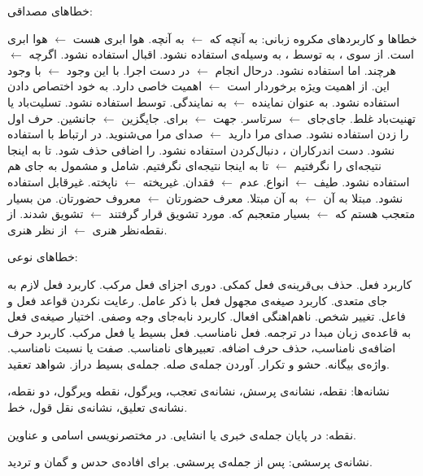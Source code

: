 \documentclass[10pt,landscape]{article}
\begin{document}
\begin{multicols*}{3}
{    خطاهای مصداقی:

    خطاها و کاربردهای مکروه زبانی:
    به آنچه که
    $\leftarrow$
    به آنچه.
    هوا ابری هست
    $\leftarrow$
    هوا ابری است.
    از سوی
    ،
    به توسط
    ،
    به وسیله‌ی
    استفاده نشود.
    اقبال استفاده نشود.
    اگرچه
    $\leftarrow$
    هرچند.
    اما استفاده نشود.
    درحال انجام
    $\leftarrow$
    در دست اجرا.
    با این وجود
    $\leftarrow$
    با وجود این.
    از اهمیت ویژه برخوردار است
    $\leftarrow$
    اهمیت خاصی دارد.
    به خود اختصاص دادن استفاده نشود.
    به عنوان نماینده
    $\leftarrow$
    به نمایندگی.
    توسط استفاده نشود.
    تسلیت‌باد یا تهنیت‌باد غلط.
    جای‌جای
    $\leftarrow$
    سرتاسر.
    جهت
    $\leftarrow$
    برای.
    جایگزین
    $\leftarrow$
    جانشین.
    حرف اول را زدن استفاده نشود.
    صدای مرا دارید
    $\leftarrow$
    صدای مرا می‌شنوید.
    در ارتباط با استفاده نشود.
    دست اندرکاران
    ،
    دنبال‌کردن استفاده نشود.
    را اضافی حذف شود.
    تا به اینجا نتیجه‌ای را نگرفتیم
    $\leftarrow$
    تا به اینجا نتیجه‌ای نگرفتیم.
    شامل و مشمول به جای هم استفاده نشود.
    طیف 
    $\leftarrow$
    انواع.
    عدم
    $\leftarrow$
    فقدان.
    غیرپخته 
    $\leftarrow$
    ناپخته.
    غیرقابل استفاده نشود.
    مبتلا به آن
    $\leftarrow$
    به آن مبتلا.
    معرف حضورتان
    $\leftarrow$
    معروف حضورتان.
    من بسیار متعجب هستم که
    $\leftarrow$
    بسیار متعجبم که.
    مورد تشویق قرار گرفتند
    $\leftarrow$
    تشویق شدند.
    از نقطه‌نظر هنری
    $\leftarrow$
    از نظر هنری.

    خطاهای نوعی:

    کاربرد فعل.
    حذف بی‌قرینه‌ی
    فعل کمکی.
    دوری اجزای فعل مرکب.
    کاربرد فعل لازم به جای متعدی.
    کاربرد صیغه‌ی مجهول فعل با ذکر عامل.
    رعایت نکردن قواعد فعل و فاعل.
    تغییر شخص.
    ناهم‌اهنگی افعال.
    کاربرد نابه‌جای وجه وصفی.
    اختیار صیغه‌ی فعل به قاعده‌ی زبان مبدا در ترجمه.
    فعل نامناسب.
    فعل بسیط یا فعل مرکب.
    کاربرد حرف اضافه‌ی نامناسب،
    حذف حرف اضافه.
    تعبیرهای نامناسب.
    صفت یا نسبت نامناسب.
    واژه‌ی بیگانه.
    حشو و تکرار.
    آوردن جمله‌ی صله.
    جمله‌ی بسیط دراز.
    شواهد تعقید.


    نشانه‌ها:
    نقطه،
    نشانه‌ی پرسش،
    نشانه‌ی تعجب،
    ویرگول،
    نقطه ویرگول،
    دو نقطه،
    نشانه‌ی تعلیق،
    نشانه‌ی نقل قول،
    خط.

    نقطه:
    در پایان جمله‌ی خبری یا انشایی.
    در مختصرنویسی اسامی و عناوین.

    نشانه‌ی پرسشی:
    پس از جمله‌ی پرسشی.
    برای افاده‌ی حدس و گمان و تردید.

}
\end{multicols*}
\end{document}
